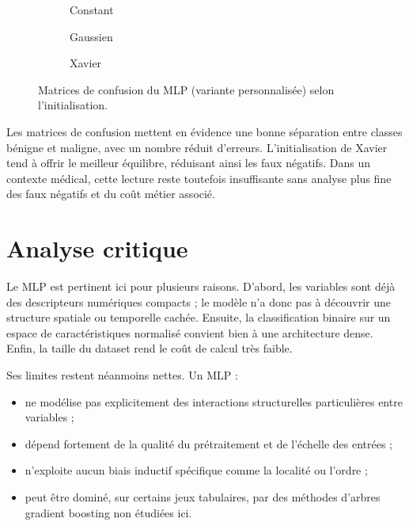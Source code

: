 \begin{figure}[H]
    \centering
    \begin{subfigure}[b]{0.32\textwidth}
        \caption{Constant}
    \end{subfigure}
    \hfill
    \begin{subfigure}[b]{0.32\textwidth}
        \caption{Gaussien}
    \end{subfigure}
    \hfill
    \begin{subfigure}[b]{0.32\textwidth}
        \caption{Xavier}
    \end{subfigure}
    
    \caption{Matrices de confusion du MLP (variante personnalisée) selon l'initialisation.}
\end{figure}
Les matrices de confusion mettent en évidence une bonne séparation entre classes bénigne et maligne, avec un nombre réduit d’erreurs. L'initialisation de Xavier tend à offrir le meilleur équilibre, réduisant ainsi les faux négatifs. Dans un contexte médical, cette lecture reste toutefois insuffisante sans analyse plus fine des faux négatifs et du coût métier associé.

\section{Analyse critique}
Le MLP est pertinent ici pour plusieurs raisons. D’abord, les variables sont déjà des descripteurs numériques compacts ; le modèle n’a donc pas à découvrir une structure spatiale ou temporelle cachée. Ensuite, la classification binaire sur un espace de caractéristiques normalisé convient bien à une architecture dense. Enfin, la taille du dataset rend le coût de calcul très faible.

Ses limites restent néanmoins nettes. Un MLP :
\begin{itemize}[leftmargin=1.2cm]
    \item ne modélise pas explicitement des interactions structurelles particulières entre variables ;
    \item dépend fortement de la qualité du prétraitement et de l’échelle des entrées ;
    \item n’exploite aucun biais inductif spécifique comme la localité ou l’ordre ;
    \item peut être dominé, sur certains jeux tabulaires, par des méthodes d’arbres gradient boosting non étudiées ici.
\end{itemize}

